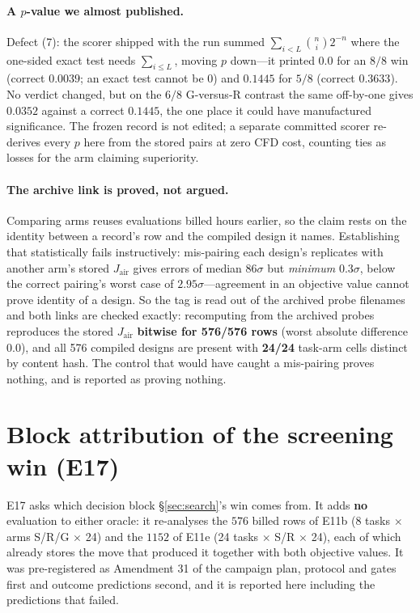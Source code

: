 \documentclass{article}
\newcommand{\Jair}{J_{\mathrm{air}}}
\begin{document}
\paragraph{A $p$-value we almost published.}
Defect (7): the scorer shipped with the run summed $\sum_{i<L}\binom{n}{i}2^{-n}$
where the one-sided exact test needs $\sum_{i\le L}$, moving $p$ down---it printed
$0.0$ for an $8/8$ win (correct $0.0039$; an exact test cannot be $0$) and $0.1445$
for $5/8$ (correct $0.3633$).  No verdict changed, but on the $6/8$ G-versus-R
contrast the same off-by-one gives $0.0352$ against a correct $0.1445$, the one place
it could have manufactured significance.  The frozen record is not edited; a separate
committed scorer re-derives every $p$ here from the stored pairs at zero CFD cost,
counting ties as losses for the arm claiming superiority.

\paragraph{The archive link is proved, not argued.}
Comparing arms reuses evaluations billed hours earlier, so the claim rests on the
identity between a record's row and the compiled design it names.  Establishing that
statistically fails instructively: mis-pairing each design's replicates with another
arm's stored $\Jair$ gives errors of median $86\sigma$ but \emph{minimum} $0.3\sigma$,
below the correct pairing's worst case of $2.95\sigma$---agreement in an objective
value cannot prove identity of a design.  So the tag is read out of the archived probe
filenames and both links are checked exactly: recomputing from the archived probes
reproduces the stored $\Jair$ \textbf{bitwise for 576/576 rows} (worst absolute
difference $0.0$), and all 576 compiled designs are present with \textbf{24/24}
task-arm cells distinct by content hash.  The control that would have caught a
mis-pairing proves nothing, and is reported as proving nothing.

\section{Block attribution of the screening win (E17)}
\label{app:e17}

E17 asks which decision block \S\ref{sec:search}'s win comes from.  It adds
\textbf{no} evaluation to either oracle: it re-analyses the $576$ billed rows of
E11b (8 tasks $\times$ arms S/R/G $\times$ 24) and the $1152$ of E11e (24 tasks
$\times$ S/R $\times$ 24), each of which already stores the move that produced it
together with both objective values.  It was pre-registered as Amendment 31 of the
campaign plan, protocol and gates first and outcome predictions second, and it is
reported here including the predictions that failed.
\end{document}
